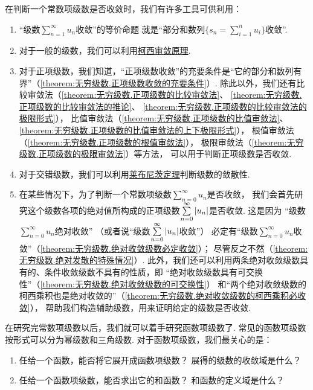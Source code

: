 在判断一个常数项级数是否收敛时，我们有许多工具可供利用：
\begin{enumerate}
\item “级数\(\sum\limits_{n=1}^\infty u_n\)收敛”的等价命题%
就是“部分和数列\(\{ s_n = \sum\limits_{i=1}^n u_i \}\)收敛”.

\item
对于一般的级数，我们可以利用\hyperref[theorem:无穷级数.级数的柯西审敛原理]{柯西审敛原理}.

\item
对于正项级数，我们知道，“正项级数收敛”的充要条件是“它的部分和数列有界”（\cref{theorem:无穷级数.正项级数收敛的充要条件}）.
除此以外，我们还有比较审敛法（\cref{theorem:无穷级数.正项级数的比较审敛法}、%
\cref{theorem:无穷级数.正项级数的比较审敛法的推论}、%
\cref{theorem:无穷级数.正项级数的比较审敛法的极限形式}），%
比值审敛法（\cref{theorem:无穷级数.正项级数的比值审敛法}、%
\cref{theorem:无穷级数.正项级数的比值审敛法的上下极限形式}），%
根值审敛法（\cref{theorem:无穷级数.正项级数的根值审敛法}），%
极限审敛法（\cref{theorem:无穷级数.正项级数的极限审敛法}）等方法，
可以用于判断正项级数是否收敛.

\item
对于交错级数，我们可以利用\hyperref[theorem:无穷级数.莱布尼茨定理]{莱布尼茨定理}判断级数的敛散性.

\item
在某些情况下，为了判断一个常数项级数\(\sum\limits_{n=0}^\infty u_n\)是否收敛，%
我们会首先研究这个级数各项的绝对值所构成的正项级数\(\sum\limits_{n=0}^\infty \abs{u_n}\)是否收敛.
这是因为%
“级数\(\sum\limits_{n=0}^\infty u_n\)绝对收敛”%
（或者说“级数\(\sum\limits_{n=0}^\infty \abs{u_n}\)收敛”）%
必定有“级数\(\sum\limits_{n=0}^\infty u_n\)收敛”（\cref{theorem:无穷级数.绝对收敛级数必定收敛}）；
尽管反之不然（\cref{theorem:无穷级数.绝对发散的特殊情况}）.
此外，我们还可以利用两条绝对收敛级数具有的、条件收敛级数不具有的性质，即%
“绝对收敛级数具有可交换性”（\cref{theorem:无穷级数.绝对收敛级数的可交换性}）%
和“两个绝对收敛级数的柯西乘积也是绝对收敛的”（\cref{theorem:无穷级数.绝对收敛级数的柯西乘积必收敛}），%
帮助我们构造辅助级数，用来证明给定的级数是否收敛.
\end{enumerate}

在研究完常数项级数以后，我们就可以着手研究函数项级数了.
常见的函数项级数按形式可以分为幂级数和三角级数.
对于函数项级数，我们最关心的是：
\begin{enumerate}
\item 任给一个函数，能否将它展开成函数项级数？
 展得的级数的收敛域是什么？
\item 任给一个函数项级数，能否求出它的和函数？
 和函数的定义域是什么？
\end{enumerate}

